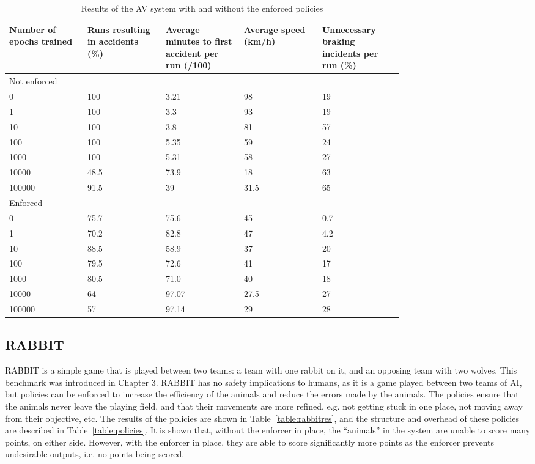 \begin{table}[h]
	\centering
	\caption{Results of the AV system with and without the enforced policies}
	\label{table:avenf}
	\begin{tabular}{|p{0.15\linewidth}|p{0.15\linewidth}|p{0.15\linewidth}|p{0.15\linewidth}|p{0.15\linewidth}|}
		\hline Number of epochs trained & Runs resulting in accidents (\%) & Average minutes to first accident per run (/100) & Average speed (km/h) & Unnecessary braking incidents per run (\%) \\ \hline
		\multicolumn{5}{|p{0.75\linewidth}|}{Not enforced} \\ \hline
		0 & 100	 & 3.21 & 98 & 19 \\ \hline
		1 & 100 & 3.3 & 93 & 19 \\ \hline
		10 & 100 & 3.8 & 81 & 57 \\ \hline
		100 & 100 & 5.35 & 59 & 24 \\ \hline
		1000 & 100 & 5.31 & 58 & 27 \\  \hline
		10000 & 48.5 & 73.9 & 18 & 63 \\ \hline
		100000 & 91.5 & 39 & 31.5 & 65 \\ \hline 
		\multicolumn{5}{|p{0.75\linewidth}|}{Enforced} \\ \hline
		0 & 75.7 & 75.6 & 45 & 0.7 \\ \hline 
		1 & 70.2 & 82.8 & 47 & 4.2 \\ \hline 
		10 & 88.5 & 58.9 & 37 & 20 \\ \hline 
		100 & 79.5 & 72.6 & 41 & 17 \\ \hline 
		1000 & 80.5 & 71.0 & 40 & 18 \\ \hline 
		10000 & 64 & 97.07 & 27.5 & 27 \\ \hline   
		100000 & 57 & 97.14 & 29 & 28 \\ \hline                  
	\end{tabular}
\end{table}

\subsection{RABBIT} \label{sec:rabbit}
RABBIT is a simple game that is played between two teams: a team with one rabbit on it, and an opposing team with two wolves. 
This benchmark was introduced in Chapter 3.
RABBIT has no safety implications to humans, as it is a game played between two teams of \ac{AI}, but policies can be enforced to increase the efficiency of the animals and reduce the errors made by the animals.
The policies ensure that the animals never leave the playing field, and that their movements are more refined, e.g. not getting stuck in one place, not moving away from their objective, etc.
The results of the policies are shown in Table~\ref{table:rabbitres}, and the structure and overhead of these policies are described in Table~\ref{table:policies}.
It is shown that, without the enforcer in place, the ``animals'' in the system are unable to score many points, on either side.
However, with the enforcer in place, they are able to score significantly more points as the enforcer prevents undesirable outputs, i.e. no points being scored.

